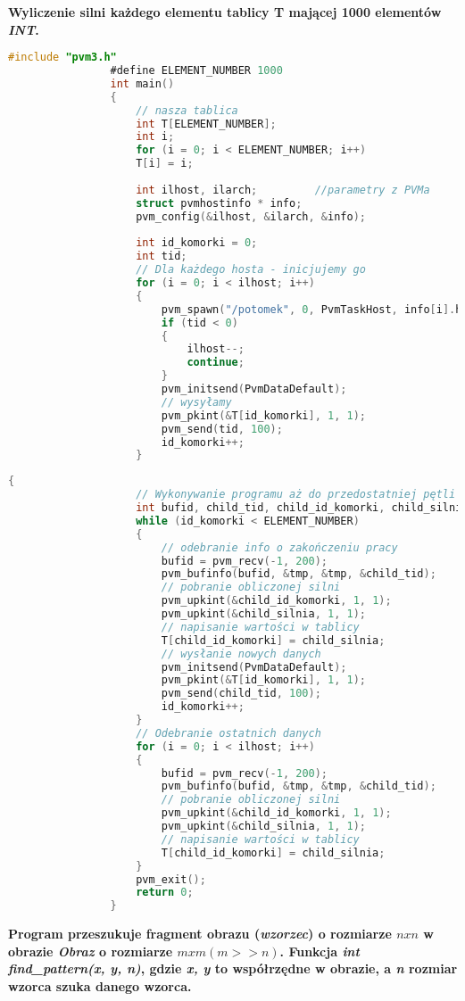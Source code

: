 			\textbf{Wyliczenie silni każdego elementu tablicy T mającej 1000 elementów \textit{INT}.}
			\begin{lstlisting}[language=C]
				#include "pvm3.h"
				#define ELEMENT_NUMBER 1000
				int main()
				{
					// nasza tablica
					int T[ELEMENT_NUMBER];
					int i;
					for (i = 0; i < ELEMENT_NUMBER; i++)
					T[i] = i;
					
					int ilhost, ilarch;			//parametry z PVMa
					struct pvmhostinfo * info;
					pvm_config(&ilhost, &ilarch, &info);
					
					int id_komorki = 0;
					int tid;
					// Dla każdego hosta - inicjujemy go
					for (i = 0; i < ilhost; i++)
					{
						pvm_spawn("/potomek", 0, PvmTaskHost, info[i].hi_name, 1, &tid);	//powołanie potomka
						if (tid < 0)
						{
							ilhost--;
							continue;
						}
						pvm_initsend(PvmDataDefault);
						// wysyłamy
						pvm_pkint(&T[id_komorki], 1, 1);
						pvm_send(tid, 100);
						id_komorki++;
					}
			\end{lstlisting}
			\begin{lstlisting}[language=C]
				{
					// Wykonywanie programu aż do przedostatniej pętli
					int bufid, child_tid, child_id_komorki, child_silnia, tmp;
					while (id_komorki < ELEMENT_NUMBER)
					{
						// odebranie info o zakończeniu pracy
						bufid = pvm_recv(-1, 200);
						pvm_bufinfo(bufid, &tmp, &tmp, &child_tid);
						// pobranie obliczonej silni
						pvm_upkint(&child_id_komorki, 1, 1);
						pvm_upkint(&child_silnia, 1, 1);
						// napisanie wartości w tablicy
						T[child_id_komorki] = child_silnia;
						// wysłanie nowych danych
						pvm_initsend(PvmDataDefault);
						pvm_pkint(&T[id_komorki], 1, 1);
						pvm_send(child_tid, 100);
						id_komorki++;
					}
					// Odebranie ostatnich danych
					for (i = 0; i < ilhost; i++)
					{
						bufid = pvm_recv(-1, 200);
						pvm_bufinfo(bufid, &tmp, &tmp, &child_tid);
						// pobranie obliczonej silni
						pvm_upkint(&child_id_komorki, 1, 1);
						pvm_upkint(&child_silnia, 1, 1);
						// napisanie wartości w tablicy
						T[child_id_komorki] = child_silnia;
					}
					pvm_exit();
					return 0;
				}
			\end{lstlisting}
				\textbf{Program przeszukuje fragment obrazu (\textit{wzorzec}) o rozmiarze $ nxn $ w obrazie \textit{Obraz} o rozmiarze $ mxm (m>>n) $. 
				Funkcja \textit{int find\_pattern(x, y, n)}, gdzie \textit{x, y} to współrzędne w obrazie, a \textit{n} rozmiar wzorca szuka danego wzorca.}
